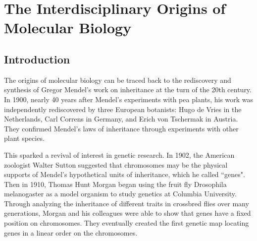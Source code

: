 \chapter{The Interdisciplinary Origins of Molecular Biology}
\label{ch25}



\section{Introduction}

The origins of molecular biology can be traced back to the rediscovery and synthesis of Gregor Mendel's work on inheritance at the turn of the 20th century. In 1900, nearly 40 years after Mendel's  experiments with pea plants, his work was independently rediscovered by three European botanists: Hugo de Vries in the Netherlands, Carl Correns in Germany, and Erich von Tschermak in Austria. They confirmed Mendel's laws of inheritance through experiments with other plant species.

This sparked a revival of interest in genetic research. In 1902, the American zoologist Walter Sutton suggested that chromosomes may be the physical supports of Mendel's hypothetical units of inheritance, which he called ``genes". Then in 1910, Thomas Hunt Morgan began using the fruit fly Drosophila melanogaster as a model organism to study genetics at Columbia University. Through analyzing the inheritance of different traits in crossbred flies over many generations, Morgan and his colleagues were able to show that genes have a fixed position on chromosomes. They eventually created the first genetic map locating genes in a linear order on the chromosomes.

